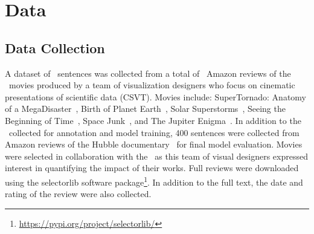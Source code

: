 

\section{Data}

\subsection{Data Collection}

\newcommand{\avllonger}{a team of visualization designers who focus on cinematic presentations of scientific data (CSVT)}

A dataset of \nsentences\ sentences was collected from a total of \nreviews\ Amazon reviews of the \nmoviesword\ movies produced by \avllonger. 
%
Movies include: SuperTornado: Anatomy of a MegaDisaster~\citep{superTornado2015}, Birth of Planet Earth~\citep{bope2019}, Solar Superstorms~\citep{solarsuperstorms2013,solarsuperstorms2015}, Seeing the Beginning of Time~\citep{sbot2017}, Space Junk~\citep{spacejunk2012}, and The Jupiter Enigma~\citep{jupterenigma2018}.   
In addition to the \nsentences\ collected for annotation and model training, 400 sentences were collected from Amazon reviews of the Hubble documentary~\citep{hubble2010} for final model evaluation.
Movies were selected in collaboration with the \avlshort\ as this team of visual designers expressed interest in quantifying the impact of their works.
Full reviews were downloaded using the \textsf{selectorlib} software package\footnote{\url{https://pypi.org/project/selectorlib/}}. %
In addition to the full text, the date and rating of the review were also collected. 

